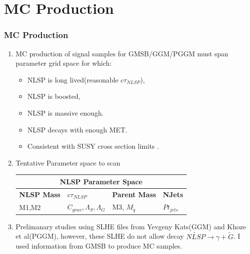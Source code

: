\documentclass[12pt]{beamer}
\begin{document}
\section{MC Production}
\begin{frame}
\frametitle{MC Production}
\begin{enumerate}
\item MC production of signal samples for GMSB/GGM/PGGM must span parameter grid space for which:
     \begin{itemize}
      \item NLSP is long lived(reasonable $c\tau_{NLSP}$),
      \item NLSP is boosted,
      \item NLSP is massive enough.
      \item NLSP decays with enough MET.
      \item Consistent with SUSY cross section limits .
     \end{itemize}
\item Tentative Parameter space to scan
\begin{table}
\begin{minipage}[b]{1.0\linewidth}\centering
\begin{tabular}{|l||l||l||l|}
  \hline
  \multicolumn{4}{|c|}{\bfseries{NLSP Parameter Space}} \\
  \hline 
  \bfseries{NLSP Mass} & \bfseries{$c\tau_{NLSP}$} & \bfseries{Parent Mass} & \bfseries{NJets} \\
\hline  
M1,M2 & $C_{grav},\Lambda_{S},\Lambda_{G}$ & M3, $M_{\tilde{q}}$ & $Pt_{jets}$\\
\hline
  \end{tabular}
  \end{minipage}
\end{table}
\item Prelimanary studies using SLHE files from \alert{Yevgeny Kats(GGM)} and \alert{Khoze et al(PGGM)}, however, these SLHE do not allow decay $\tilde{NLSP}\rightarrow \gamma + \tilde{G} $. I used information from GMSB to produce MC samples.
\end{enumerate}

\end{frame}
\end{document}

